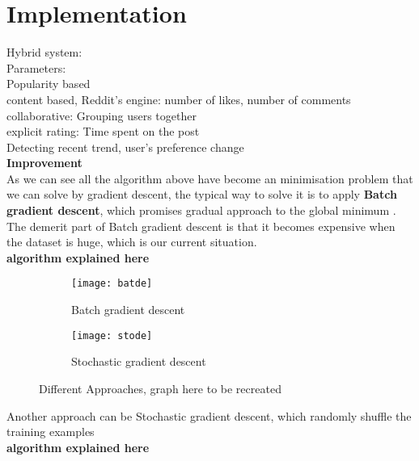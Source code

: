 \section{Implementation}
Hybrid system:
\\Parameters: 
\\Popularity based
\\content based, Reddit's engine:  number of likes, number of comments
\\collaborative: Grouping users together
\\explicit rating: Time spent on the post
\\Detecting recent trend, user's preference change
\\ \textbf{Improvement}
\\ As we can see all the algorithm above have become an minimisation problem that we can solve by gradient descent, the typical way to solve it is to apply \textbf{Batch gradient descent}, which promises gradual approach to the global minimum . The demerit part of Batch gradient descent is that it becomes expensive when the dataset is huge, which is our current situation.
\\ \textbf{algorithm explained here}

\begin{figure}[ht]
     \centering
     \hspace{8mm}
     \begin{subfigure}[b]{0.4\textwidth}
         \centering
         \texttt{[image: batde]}
         \caption{Batch gradient descent}
         \label{batde}
     \end{subfigure}
     \hfill
          \begin{subfigure}[b]{0.4\textwidth}
         \centering
         \texttt{[image: stode]}
         \caption{Stochastic gradient descent}
         \label{Stochastic gradient descent}
     \end{subfigure}
          \hspace{8mm}
        \caption{Different Approaches, graph here to be recreated}
        \label{Approaches}
\end{figure}
Another approach can be {Stochastic gradient descent}, which randomly shuffle the training examples 
\\ \textbf{algorithm explained here}





